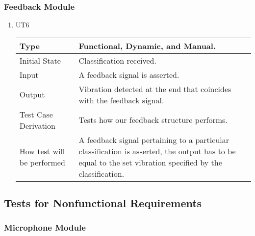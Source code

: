 \documentclass[12pt, titlepage]{article}
\begin{document}
\subsubsection{Feedback Module}

\begin{enumerate}

\item{UT6\\}

\begin{tabular}{ |p{5cm}||p{7cm}| }
    \hline
    Type & Functional, Dynamic, and Manual. \\
    \hline
    Initial State  &  Classification received. \\
    \hline
    Input &   A feedback signal is asserted.  \\
    \hline
    Output &   Vibration detected at the end that coincides with the feedback signal.  \\
    \hline
    Test Case Derivation &   Tests how our feedback structure performs. \\
    \hline
    How test will be performed & A feedback signal pertaining to a particular classification is asserted, the output has to be equal to the set vibration specified by the classification. \\
    \hline
\end{tabular}

\end{enumerate}

\subsection{Tests for Nonfunctional Requirements}



\subsubsection{Microphone Module}
\end{document}
